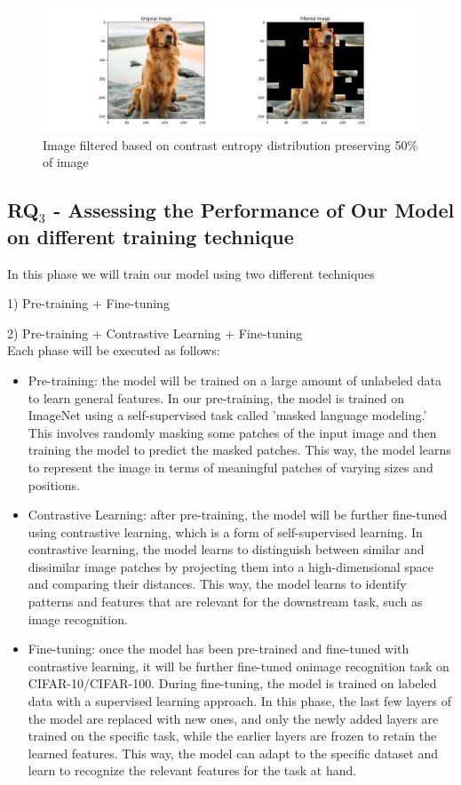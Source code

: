     \begin{figure}[!htp]
        \centering
        \includegraphics[width=\columnwidth]{images/dog_entropy.png}
        \caption{Image filtered based on contrast entropy distribution preserving 50\% of image}
        \label{fig:dog_entropy}
    \end{figure}
\subsection{\textbf{RQ$_{3}$} - Assessing the Performance of Our Model on different training technique} In this phase we will train our model using two different techniques

1) Pre-training + Fine-tuning

2) Pre-training + Contrastive Learning + Fine-tuning
\\
Each phase will be executed as follows:
\begin{itemize}
    \item Pre-training: the model will be trained on a large amount of unlabeled data to learn general features. In our pre-training, the model is trained on ImageNet using a self-supervised task called 'masked language modeling.' This involves randomly masking some patches of the input image and then training the model to predict the masked patches. This way, the model learns to represent the image in terms of meaningful patches of varying sizes and positions.

    \item Contrastive Learning: after pre-training, the model will be further fine-tuned using contrastive learning, which is a form of self-supervised learning. In contrastive learning, the model learns to distinguish between similar and dissimilar image patches by projecting them into a high-dimensional space and comparing their distances. This way, the model learns to identify patterns and features that are relevant for the downstream task, such as image recognition.

    \item Fine-tuning: once the model has been pre-trained and fine-tuned with contrastive learning, it will be further fine-tuned onimage recognition task on CIFAR-10/CIFAR-100. During fine-tuning, the model is trained on labeled data with a supervised learning approach. In this phase, the last few layers of the model are replaced with new ones, and only the newly added layers are trained on the specific task, while the earlier layers are frozen to retain the learned features. This way, the model can adapt to the specific dataset and learn to recognize the relevant features for the task at hand.
\end{itemize}